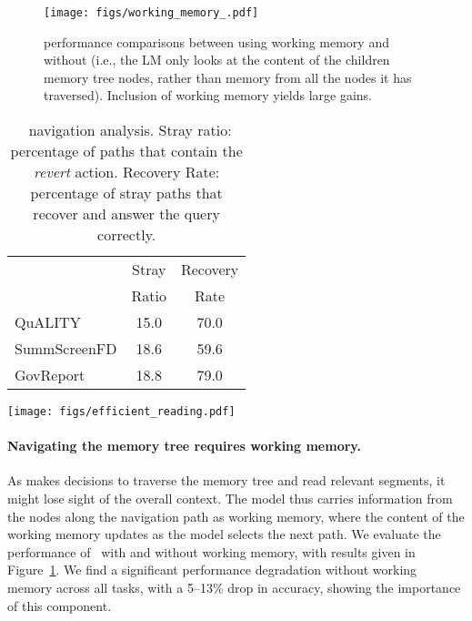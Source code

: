 \begin{figure}[t!]
    \centering
    \texttt{[image: figs/working\_memory\_.pdf]}
    \caption{
        \sysname{} performance comparisons between using working memory and without (i.e., the LM only looks at the content of the children memory tree nodes, rather than memory from all the nodes it has traversed). Inclusion of working memory yields large gains.
    }
    \label{fig:working_memory} 
    \vspace{-8pt}
\end{figure}\begin{table}[t]
\RawFloats
\begin{minipage}{.47\linewidth}
    \centering
    \caption{\sysname{}~navigation analysis. Stray ratio: percentage of paths that contain the \textit{revert} action. Recovery Rate: percentage of stray paths that recover and answer the query correctly.}
    \label{table:recovery}
    \begin{tabular}{lcc}
        \toprule
         & Stray & Recovery \\
         & Ratio & Rate \\
        \midrule
        QuALITY & 15.0 & 70.0 \\
        SummScreenFD & 18.6 & 59.6 \\
        GovReport & 18.8 & 79.0 \\
        \bottomrule
    \end{tabular}
\end{minipage}
\begin{minipage}{.52\linewidth}
    \centering
    \texttt{[image: figs/efficient\_reading.pdf]}
    \label{fig:efficient_reading}
\end{minipage}
\end{table}
\vspace{-7pt}

\paragraph{Navigating the memory tree requires working memory.}
As \sysname{} makes decisions to traverse the memory tree and read  relevant segments, it might lose sight of the overall context. The model thus carries information from the nodes along the navigation path as working memory, where the content of the working memory updates as the model selects the next path. 
We evaluate the performance of \sysname{}~with and without working memory, with results given in Figure~\ref{fig:working_memory}.
We find a significant performance
degradation without working memory across all tasks, with a 5--13\% drop in accuracy,
showing the importance of this component.

